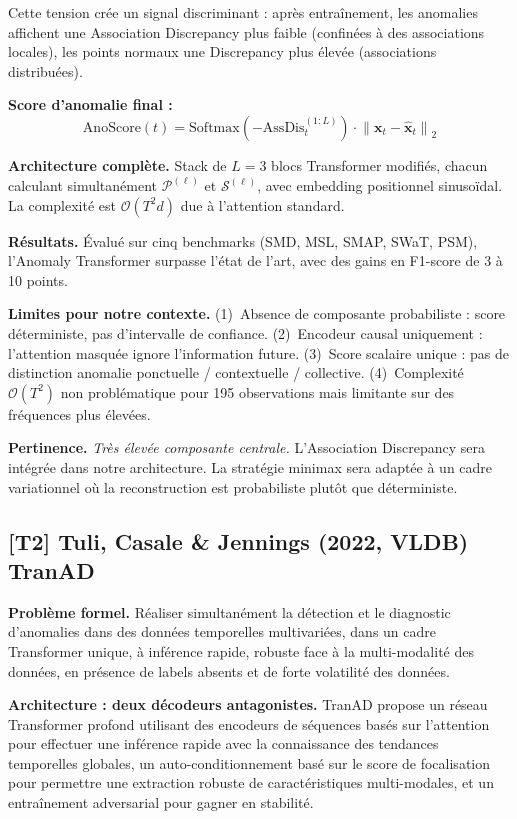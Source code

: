 \documentclass[12pt,a4paper]{article}
\begin{document}
Cette tension crée un signal discriminant : après entraînement, les anomalies affichent une Association Discrepancy plus faible (confinées à des associations locales), les points normaux une Discrepancy plus élevée (associations distribuées).

\textbf{Score d'anomalie final :}
$$\mathrm{AnoScore}(t) = \mathrm{Softmax}\!\left(-\mathrm{AssDis}^{(1:L)}_t\right)\cdot\left\|\mathbf{x}_t - \hat{\mathbf{x}}_t\right\|_2$$

\textbf{Architecture complète.} Stack de $L = 3$ blocs Transformer modifiés, chacun calculant simultanément $\mathcal{P}^{(\ell)}$ et $\mathcal{S}^{(\ell)}$, avec embedding positionnel sinusoïdal. La complexité est $\mathcal{O}(T^2 d)$ due à l'attention standard.

\textbf{Résultats.} Évalué sur cinq benchmarks (SMD, MSL, SMAP, SWaT, PSM), l'Anomaly Transformer surpasse l'état de l'art, avec des gains en F1-score de 3 à 10 points.

\textbf{Limites pour notre contexte.} (1)~Absence de composante probabiliste : score déterministe, pas d'intervalle de confiance. (2)~Encodeur causal uniquement : l'attention masquée ignore l'information future. (3)~Score scalaire unique : pas de distinction anomalie ponctuelle / contextuelle / collective. (4)~Complexité $\mathcal{O}(T^2)$ non problématique pour 195 observations mais limitante sur des fréquences plus élevées.

\textbf{Pertinence.} \textit{Très élevée  composante centrale.} L'Association Discrepancy sera intégrée dans notre architecture. La stratégie minimax sera adaptée à un cadre variationnel où la reconstruction est probabiliste plutôt que déterministe.

\subsection{[T2] Tuli, Casale \& Jennings (2022, VLDB)  TranAD}

\textbf{Problème formel.} Réaliser simultanément la détection et le diagnostic d'anomalies dans des données temporelles multivariées, dans un cadre Transformer unique, à inférence rapide, robuste face à la multi-modalité des données, en présence de labels absents et de forte volatilité des données.

\textbf{Architecture : deux décodeurs antagonistes.} TranAD propose un réseau Transformer profond utilisant des encodeurs de séquences basés sur l'attention pour effectuer une inférence rapide avec la connaissance des tendances temporelles globales, un auto-conditionnement basé sur le score de focalisation pour permettre une extraction robuste de caractéristiques multi-modales, et un entraînement adversarial pour gagner en stabilité.
\end{document}
